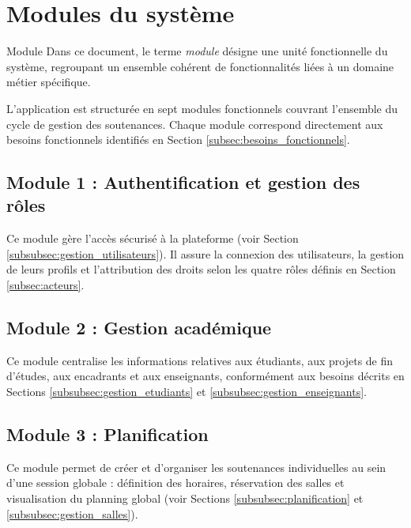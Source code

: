 \documentclass[12pt,a4paper]{article}
\begin{document}
\section{Modules du système}

\begin{projectbox}{Module}
    Dans ce document, le terme \textit{module} désigne une unité fonctionnelle du système,
    regroupant un ensemble cohérent de fonctionnalités liées à un domaine métier spécifique.
\end{projectbox}

\label{sec:modules}

L'application est structurée en sept modules fonctionnels couvrant l'ensemble du
cycle de gestion des soutenances. Chaque module correspond directement aux besoins
fonctionnels identifiés en Section \ref{subsec:besoins_fonctionnels}.

\subsection{Module 1 : Authentification et gestion des rôles}
\label{subsec:module_auth}

Ce module gère l'accès sécurisé à la plateforme (voir Section
\ref{subsubsec:gestion_utilisateurs}). Il assure la connexion des utilisateurs,
la gestion de leurs profils et l'attribution des droits selon les quatre rôles
définis en Section \ref{subsec:acteurs}.

\subsection{Module 2 : Gestion académique}
\label{subsec:module_academique}

Ce module centralise les informations relatives aux étudiants, aux projets de
fin d'études, aux encadrants et aux enseignants, conformément aux besoins décrits
en Sections \ref{subsubsec:gestion_etudiants} et \ref{subsubsec:gestion_enseignants}.

\subsection{Module 3 : Planification}
\label{subsec:module_planification}

Ce module permet de créer et d'organiser les soutenances individuelles au sein
d'une session globale : définition des horaires, réservation des salles et
visualisation du planning global (voir Sections \ref{subsubsec:planification} et
\ref{subsubsec:gestion_salles}).
\end{document}
